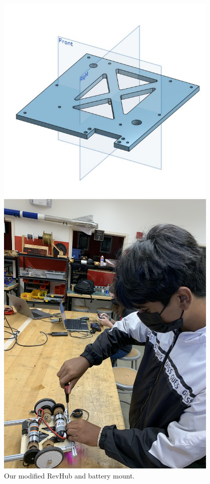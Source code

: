 \begin{figure}[ht]
\centering
\begin{minipage}[b]{.48\textwidth}
  \centering
  \includegraphics[width=0.95\textwidth]{Meetings/October/10-10-21/10-10-2021_Hardware_Figure1 - Nathan Forrer.JPG}
  \caption{Our modified RevHub and battery mount.}
  \label{fig:pic1}
\end{minipage}%
\hfill%
\begin{minipage}[b]{.48\textwidth}
  \centering
  \includegraphics[width=0.95\textwidth]{Meetings/October/10-10-21/10-10-2021_Hardware_Figure2 - Nathan Forrer.JPG}

\end{minipage}
\end{figure}
